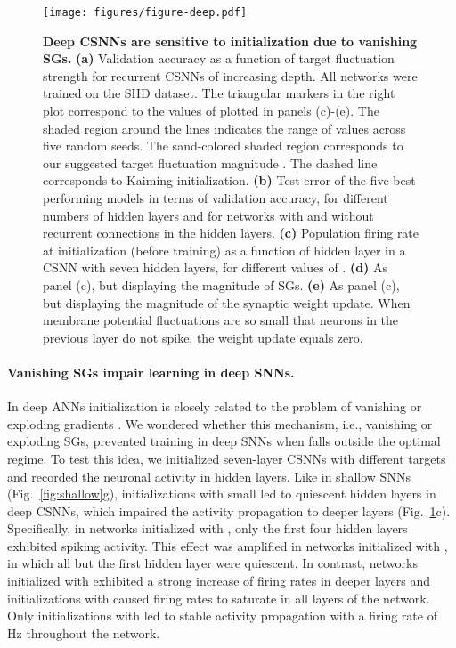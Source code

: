 \documentclass[11pt,a4paper]{article}
\begin{document}
\begin{figure}[tb]
    \centering
    \texttt{[image: figures/figure-deep.pdf]}
    \caption{\textbf{Deep \acp{CSNN} are sensitive to initialization due to vanishing \acp{SG}.} 
    \textbf{(a)} Validation accuracy as a function of target fluctuation strength  for recurrent \acp{CSNN} of increasing depth. All networks were trained on the SHD dataset. The triangular markers in the right plot correspond to the values of  plotted in panels (c)-(e). The shaded region around the lines indicates the range of values across five random seeds. The sand-colored shaded region corresponds to our suggested target fluctuation magnitude . The dashed line corresponds to Kaiming initialization.
    \textbf{(b)} Test error of the five best performing models in terms of validation accuracy, for different numbers of hidden layers and for networks with and without recurrent connections in the hidden layers.
    \textbf{(c)} Population firing rate at initialization (before training) as a function of hidden layer in a \ac{CSNN} with seven hidden layers, for different values of .
    \textbf{(d)} As panel (c), but displaying the magnitude of \acp{SG}. 
    \textbf{(e)} As panel (c), but displaying the magnitude of the synaptic weight update. When membrane potential fluctuations are so small that neurons in the previous layer do not spike, the weight update equals zero.
    }
    \label{fig:deep}
\end{figure}

\paragraph{Vanishing \acp{SG} impair learning in deep \acp{SNN}.}
In deep \acp{ANN} initialization is closely related to the problem of vanishing or exploding gradients \citep{Hochreiter1991-uo,Hochreiter1997-hj}. 
We wondered whether this mechanism, i.e., vanishing or exploding \acp{SG}, prevented training in deep \acp{SNN} when  falls outside the optimal regime.
To test this idea, we initialized seven-layer \acp{CSNN} with different targets  and recorded the neuronal activity in hidden layers.
Like in shallow \acp{SNN} (Fig.~\ref{fig:shallow}g), initializations with small  led to quiescent hidden layers in deep \acp{CSNN}, which impaired the activity propagation to deeper layers (Fig.~\ref{fig:deep}c).
Specifically, in networks initialized with , only the first four hidden layers exhibited spiking activity.
This effect was amplified in networks initialized with , in which all but the first hidden layer were quiescent. 
In contrast, networks initialized with  exhibited a strong increase of firing rates in deeper layers and initializations with  caused firing rates to saturate in all layers of the network.
Only initializations with  led to stable activity propagation with a firing rate of  Hz throughout the network. 
\end{document}
